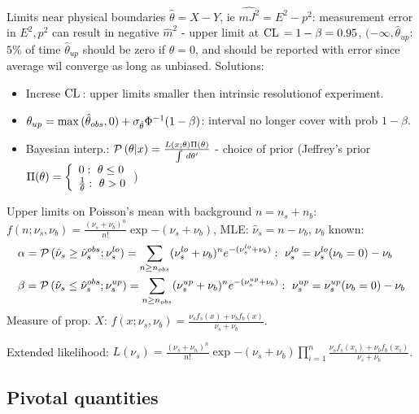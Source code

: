 \documentclass[asd-beamer.tex]{subfiles}%
\begin{document}
    \begin{frame}{Limits near physical boundaries}
        $\hat{\theta}=X-Y$, ie $\hat{mJ^2}=E^2-p^2$: measurement error in $E^2,p^2$ can result in negative $\hat{m}^2$ - upper limit at $\operatorname{CL}{}=1-\beta=0.95$, $(-\infty,\hat{\theta}_{up}$: $5\%$ of time $\hat{\theta}_{up}$ should be zero if $\theta=0$, and should be reported with error since average wil converge as long as unbiased. Solutions:
            \begin{itemize}
                \item Increse $\operatorname{CL}{}$: upper limits smaller then intrinsic resolutionof experiment.
                \item $\theta_{up}=\max{(\hat{\theta}_{obs},0)}+\sigma_{\hat{\theta}}{\Phi}^{-1}(1-\beta)$: interval no longer cover with prob $1-\beta$.
                \item Bayesian interp.: $\operatorname{\mathcal{P}}{(\theta|x)}=\frac{L(x;\theta)\Pi(\theta)}{\int\,d\theta'}$ - choice of prior (Jeffrey's prior $\Pi(\theta)=\lbt{0:\ \theta\leq0}{\frac{1}{\theta}:\ \theta>0}$)
            \end{itemize}
    \end{frame}

    \begin{frame}{Upper limits on Poisson's mean with background}
        $n=n_s+n_b$: $f(n;\nu_s,\nu_b)=\frac{(\nu_s+\nu_b)^n}{n!}\exp{-(\nu_s+\nu_b)}$, MLE: $\hat{\nu}_s=n-\nu_b$, $\nu_b$ known:
        \begin{align*}
            &\alpha=\prob{(\hat{\nu}_s\geq\hat{\nu}_s^{obs};\nu_s^{lo})}=\sum_{n\geq n_{obs}}(\nu_s^{lo}+\nu_b)^n\exp{-(\nu_s^{lo}+\nu_b)}:\ \nu_s^{lo}=\nu_s^{lo}(\nu_b=0)-\nu_b\\
        &\beta=\prob{(\hat{\nu}_s\leq\hat{\nu}_s^{obs};\nu_s^{up})}=\sum_{n\geq n_{obs}}(\nu_s^{up}+\nu_b)^n\exp{-(\nu_s^{up}+\nu_b)}:\ \nu_s^{up}=\nu_s^{up}(\nu_b=0)-\nu_b\\
        \end{align*}
        Measure of prop. $X$: $f(x;\nu_s,\nu_b)=\frac{\nu_sf_s(x)+\nu_bf_b(x)}{\nu_s+\nu_b}$.

        Extended likelihood: $L(\nu_s)=\frac{(\nu_s+\nu_n)^n}{n!}\exp{-(\nu_s+\nu_b)}\prod_{i=1}^n \frac{\nu_sf_s(x_i)+\nu_bf_b(x_i)}{\nu_s+\nu_b}$.
    \end{frame}

\subsection{Pivotal quantities}
\end{document}
